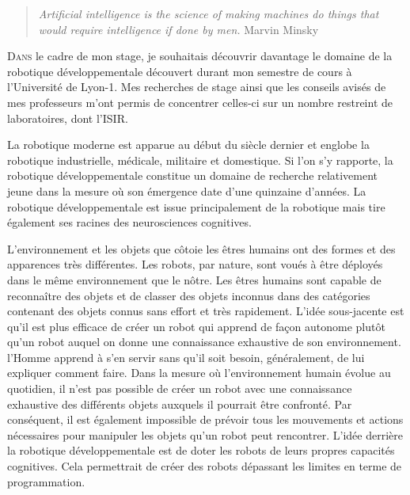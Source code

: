 \documentclass[draft]{llncs}
\begin{document}


 \begin{quotation}
  \textit{Artificial intelligence is the science of making machines do things that would require intelligence if done by men.} Marvin Minsky
 \end{quotation}

 
\lettrine{D}{ans} le cadre de mon stage, je souhaitais découvrir davantage le domaine de la robotique développementale découvert durant mon semestre de cours à l'Université de Lyon-1.
Mes recherches de stage ainsi que les conseils avisés de mes professeurs m'ont permis de concentrer celles-ci sur un nombre restreint de laboratoires, dont l'ISIR.

La robotique moderne est apparue au début du siècle dernier et englobe la robotique industrielle, médicale, militaire et domestique.
Si l'on s'y rapporte, la robotique développementale constitue un domaine de recherche relativement jeune dans la mesure où son émergence date d'une quinzaine d'années.
La robotique développementale est issue principalement de la robotique mais tire également ses racines des neurosciences cognitives.


L'environnement et les objets que côtoie les êtres humains ont des formes et des apparences très différentes.
Les robots, par nature, sont voués à être déployés dans le même environnement que le nôtre.
Les êtres humains sont capable de reconnaître des objets et de classer des objets inconnus dans des catégories contenant des objets connus sans effort et très rapidement.
L'idée sous-jacente est qu'il est plus efficace de créer un robot qui apprend de façon autonome plutôt qu'un robot auquel on donne une connaissance exhaustive de son environnement.
l'Homme apprend à s'en servir sans qu'il soit besoin, généralement, de lui expliquer comment faire.
Dans la mesure où l'environnement humain évolue au quotidien, il n'est pas possible de créer un robot avec une connaissance exhaustive des différents objets auxquels il pourrait être confronté.
Par conséquent, il est également impossible de prévoir tous les mouvements et actions nécessaires pour manipuler les objets qu'un robot peut rencontrer.
L'idée derrière la robotique développementale est de doter les robots de leurs propres capacités cognitives.
Cela permettrait de créer des robots dépassant les limites en terme de programmation.
\end{document}

